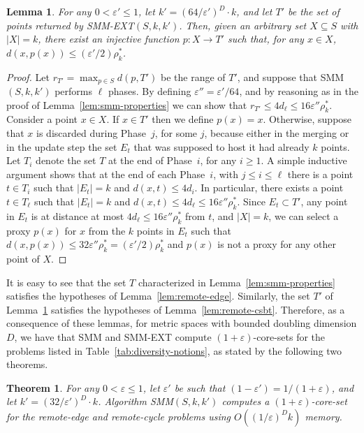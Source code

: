 \documentclass{article}
\newtheorem{theorem}{Theorem}
\newtheorem{lemma}{Lemma}
\renewcommand{\epsilon}{\varepsilon}
\newcommand{\BO}[1]{O\left( #1 \right)}
\begin{document}
\begin{lemma}\label{lem:smm-ext-properties}
  For any $0 < \epsilon' \leq 1$, let $k'=(64/\epsilon')^D\cdot k$,
  and let $T'$ be the set of points returned by {\sc
    SMM-EXT}$(S, k, k')$. Then, given an arbitrary set $X\subseteq S$
  with $|X|=k$, there exist an injective function $p: X\rightarrow T'$
  such that, for any $x \in X$,
  $d(x, p(x)) \le (\epsilon'/2)\rho_k^*$.
\end{lemma}
\begin{proof}
  Let $r_{T'}=\max_{p\in S} d(p, T')$ be the range of $T'$, and
  suppose that {\sc SMM}$(S, k, k')$ performs $\ell$ phases. By
  defining $\epsilon''=\epsilon'/64$, and by reasoning as in the proof
  of Lemma~\ref{lem:smm-properties} we can show that
  $r_{T'} \le 4d_{\ell} \le 16\epsilon''\rho_k^*$. Consider a point
  $x \in X$. If $x \in T'$ then we define $p(x)=x$. Otherwise, suppose
  that $x$ is discarded during Phase~$j$, for some $j$, because either
  in the merging or in the update step the set $E_t$ that was supposed
  to host it had already $k$ points. Let $T_i$ denote the set $T$ at
  the end of Phase~$i$, for any $i \ge 1$. A simple inductive argument
  shows that at the end of each Phase~$i$, with $j \le i \le \ell$
  there is a point $t \in T_i$ such that $|E_t|=k$ and
  $d(x,t) \leq 4d_i$. In particular, there exists a point
  $t \in T_{\ell}$ such that $|E_t|=k$ and
  $d(x,t) \leq 4d_{\ell} \le 16\epsilon''\rho_k^*$.  Since
  $E_t \subset T'$, any point in $E_t$ is at distance at most
  $4d_{\ell} \le 16\epsilon''\rho_k^*$ from $t$, and $|X|=k$, we can
  select a proxy $p(x)$ for $x$ from the $k$ points in $E_t$ such that
  $d(x,p(x)) \le 32\epsilon''\rho_k^* = (\epsilon'/2)\rho_k^*$ and
  $p(x)$ is not a proxy for any other point of $X$.
\end{proof}

It is easy to see that the set $T$ characterized in
Lemma~\ref{lem:smm-properties} satisfies the hypotheses of
Lemma~\ref{lem:remote-edge}. Similarly,
the set $T'$ of Lemma~\ref{lem:smm-ext-properties} satisfies the
hypotheses of Lemma~\ref{lem:remote-csbt}. Therefore, as a consequence
of these lemmas, for metric spaces with bounded doubling dimension
$D$, we have that {\sc SMM} and {\sc SMM-EXT} compute
$(1+\epsilon)$-core-sets for the problems listed in
Table~\ref{tab:diversity-notions}, as stated by the following two
theorems.

\begin{theorem}\label{thm:streaming-remote-edge}
  For any $0 < \epsilon \leq 1$, let $\epsilon'$ be such that
  $(1-\epsilon')=1/(1+\epsilon)$, and let
  $k'=(32/\epsilon')^D\cdot k$. Algorithm {\sc SMM}$(S, k, k')$
  computes a $(1+\epsilon)$-core-set for the remote-edge and
  remote-cycle problems using $\BO{(1/\epsilon)^Dk}$ memory.
\end{theorem}
\end{document}
